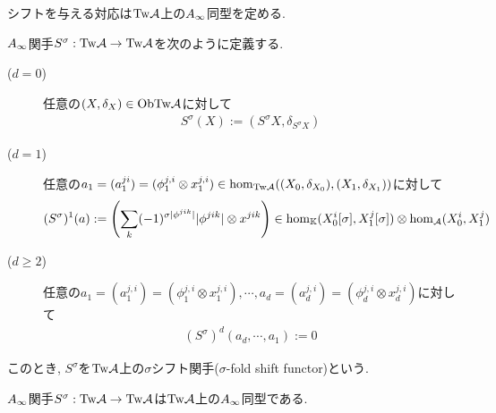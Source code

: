 \documentclass[aspectratio=169, dvipdfmx, 8pt, notheorems, uplatex]{beamer}
\begin{document}
\begin{frame}
  シフトを与える対応は$\mathrm{Tw}\mathcal{A}$上の$A_\infty$同型を定める. 

  \begin{definition}
    $A_\infty$関手$S^\sigma : \mathrm{Tw}\mathcal{A} \to \mathrm{Tw}\mathcal{A}$を次のように定義する.  
    \begin{description}
      \item[($d=0$)] 任意の$(X,\delta_X) \in \mathrm{Ob}\mathrm{Tw}\mathcal{A}$に対して
      \begin{align*}
        S^\sigma(X) := (S^\sigma X, \delta_{S^\sigma X})
      \end{align*}
      \item[($d=1$)] 任意の$a_1 = (a_1^{ji}) = (\phi_1^{j,i} \otimes x_1^{j,i}) \in \hom_{\mathrm{Tw}\mathcal{A}}((X_0,\delta_{X_0}),(X_1,\delta_{X_1}))$に対して
      \begin{align*}
        (S^\sigma)^1(a) 
        := \qty(\sum_{k} (-1)^{\sigma |\phi^{jik}|} |\phi^{jik}| \otimes x^{jik}) 
        \in \hom_{\mathbb{K}}(X_0^i[\sigma], X_1^j[\sigma]) \otimes \hom_{\mathcal{A}}(X_0^i,X_1^j)
      \end{align*}
      \item[($d \geq 2$)] 任意の$a_1 = (a_1^{j,i}) = (\phi_1^{j,i} \otimes x_1^{j,i}), \cdots, a_d = (a_d^{j,i}) = (\phi_d^{j,i} \otimes x_d^{j,i})$に対して
      \begin{align*}
        (S^\sigma)^d(a_d,\cdots,a_1)
        := 0
      \end{align*}
    \end{description}
    このとき, $S^\sigma$を$\mathrm{Tw}\mathcal{A}$上の$\sigma$シフト関手($\sigma$-fold shift functor)という.
  \end{definition}

  \begin{lemma}
    $A_\infty$関手$S^\sigma : \mathrm{Tw}\mathcal{A} \to \mathrm{Tw}\mathcal{A}$は$\mathrm{Tw}\mathcal{A}$上の$A_\infty$同型である. 
  \end{lemma}
\end{frame}
\end{document}
